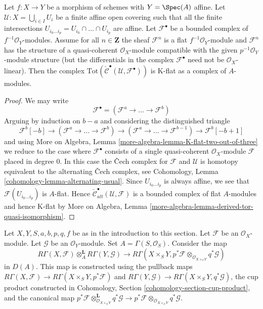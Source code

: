 \begin{lemma}
\label{lemma-K-flat}
Let $f : X \to Y$ be a morphism of schemes with $Y = \Spec(A)$ affine.
Let $\mathcal{U} : X = \bigcup_{i \in I} U_i$ be a finite affine open covering
such that all the finite intersections
$U_{i_0 \ldots i_p} = U_{i_0} \cap \ldots \cap U_{i_p}$
are affine. Let $\mathcal{F}^\bullet$ be a bounded complex of
$f^{-1}\mathcal{O}_Y$-modules. Assume for all $n \in \mathbf{Z}$
the sheaf $\mathcal{F}^n$ is a flat $f^{-1}\mathcal{O}_Y$-module and
$\mathcal{F}^n$ has the structure of a quasi-coherent $\mathcal{O}_X$-module
compatible with the given $p^{-1}\mathcal{O}_Y$-module structure (but the
differentials in the complex $\mathcal{F}^\bullet$ need not
be $\mathcal{O}_X$-linear). Then the complex
$\text{Tot}(\check{\mathcal{C}}^\bullet(\mathcal{U}, \mathcal{F}^\bullet))$
is K-flat as a complex of $A$-modules.
\end{lemma}

\begin{proof}
We may write
$$
\mathcal{F}^\bullet = (\mathcal{F}^a \to \ldots \to \mathcal{F}^b)
$$
Arguing by induction on $b - a$ and considering the distinguished triangle
$$
\mathcal{F}^b[-b] \to (\mathcal{F}^a \to \ldots \to \mathcal{F}^b)
\to (\mathcal{F}^a \to \ldots \to \mathcal{F}^{b - 1}) \to
\mathcal{F}^b[-b + 1]
$$
and using
More on Algebra, Lemma \ref{more-algebra-lemma-K-flat-two-out-of-three}
we reduce to the case where $\mathcal{F}^\bullet$ consists of a
single quasi-coherent $\mathcal{O}_X$-module $\mathcal{F}$
placed in degree $0$. In this case the {\v C}ech complex
for $\mathcal{F}$ and $\mathcal{U}$ is homotopy equivalent to the
alternating {\v C}ech complex, see
Cohomology, Lemma \ref{cohomology-lemma-alternating-usual}.
Since $U_{i_0 \ldots i_p}$ is always affine, we see that
$\mathcal{F}(U_{i_0 \ldots i_p})$ is $A$-flat.
Hence
$\check{\mathcal{C}}_{alt}^\bullet(\mathcal{U}, \mathcal{F})$
is a bounded complex of flat $A$-modules and hence K-flat
by More on Algebra, Lemma
\ref{more-algebra-lemma-derived-tor-quasi-isomorphism}.
\end{proof}

\noindent
Let $X, Y, S, a, b, p, q, f$ be as in the introduction to this section.
Let $\mathcal{F}$ be an $\mathcal{O}_X$-module.
Let $\mathcal{G}$ be an $\mathcal{O}_Y$-module.
Set $A = \Gamma(S, \mathcal{O}_S)$.
Consider the map
\begin{equation}
\label{equation-kunneth-single-sheaves}
R\Gamma(X, \mathcal{F})
\otimes_A^\mathbf{L}
R\Gamma(Y, \mathcal{G})
\longrightarrow
R\Gamma(X \times_S Y,
p^*\mathcal{F}
\otimes_{\mathcal{O}_{X \times_S Y}}
q^*\mathcal{G})
\end{equation}
in $D(A)$. This map is constructed using the pullback maps
$R\Gamma(X, \mathcal{F}) \to R\Gamma(X \times_S Y, p^*\mathcal{F})$ and
$R\Gamma(Y, \mathcal{G}) \to R\Gamma(X \times_S Y, q^*\mathcal{G})$,
the cup product constructed in
Cohomology, Section \ref{cohomology-section-cup-product}, and
the canonical map
$p^*\mathcal{F}
\otimes_{\mathcal{O}_{X \times_S Y}}^\mathbf{L}
q^*\mathcal{G}
\to
p^*\mathcal{F}
\otimes_{\mathcal{O}_{X \times_S Y}}
q^*\mathcal{G}$.

